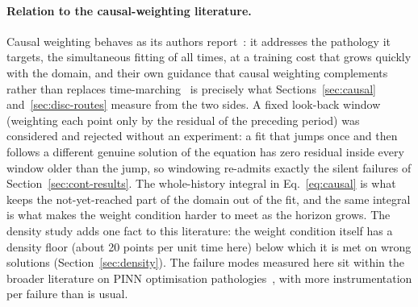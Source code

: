 \documentclass[11pt,a4paper]{article}
\begin{document}
\paragraph{Relation to the causal-weighting literature.}
Causal weighting behaves as its authors report~\cite{wang2024causal}: it
addresses the pathology it targets, the simultaneous fitting of all
times, at a training cost that grows quickly with the domain, and their
own guidance that causal weighting complements rather than replaces
time-marching~\cite{wang2023expert} is precisely what
Sections~\ref{sec:causal} and~\ref{sec:disc-routes} measure from the two
sides. A fixed look-back window (weighting each point only by the residual
of the preceding period) was considered and rejected without an
experiment: a fit that jumps once and then follows a different genuine
solution of the equation has zero residual inside every window older than
the jump, so windowing re-admits exactly the silent failures of
Section~\ref{sec:cont-results}. The whole-history
integral in Eq.~\eqref{eq:causal} is what keeps the not-yet-reached part
of the domain out of the fit, and the same integral is what makes the
weight condition harder to meet as the horizon grows. The density study
adds one fact to this literature: the weight condition itself has a
density floor (about 20 points per unit time here) below which it is met
on wrong solutions (Section~\ref{sec:density}). The failure
modes measured here sit within the broader literature on PINN optimisation
pathologies~\cite{wang2021gradient,krishnapriyan2021}, with more instrumentation per failure than is usual.
\end{document}
